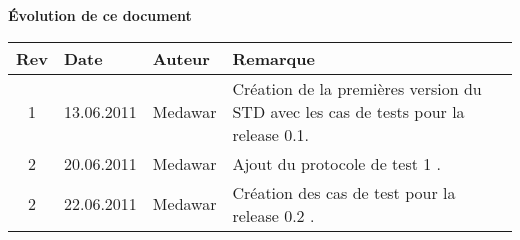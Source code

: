 \begin{large}
\textbf{Évolution de ce  document\\}
\end{large}
\begin{tabular}{|c|l|l|p{10cm}|}
\hline  Rev &  Date &  Auteur & Remarque \\ 
\hline  1 &  13.06.2011 & Medawar  & Création de la premières version du STD avec les cas de tests pour la release 0.1. \\ 
\hline  2 &  20.06.2011 & Medawar  & Ajout du protocole de test 1 . \\ 
\hline  2 &  22.06.2011 & Medawar  & Création des cas de test pour la release 0.2 . \\ 
\hline 
\end{tabular} 